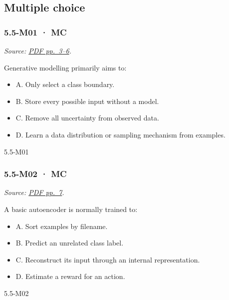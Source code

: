 \subsection{Multiple choice}\label{multiple-choice-17}

\noindent\begin{minipage}{\linewidth}

\subsubsection{5.5-M01 · MC}\label{m01-mc-16}

\emph{Source:
\href{../Lecture\%20Slides/5.5.\%20Generative\%20Models.pdf\#page=3}{PDF
pp.~3--6}.}

Generative modelling primarily aims to:

\begin{itemize}
\tightlist
\item
  A. Only select a class boundary.
\item
  B. Store every possible input without a model.
\item
  C. Remove all uncertainty from observed data.
\item
  D. Learn a data distribution or sampling mechanism from examples.
\end{itemize}

\begin{solution}[8mm]{5.5-M01}

\end{solution}
\end{minipage}\par\medskip

\noindent\begin{minipage}{\linewidth}

\subsubsection{5.5-M02 · MC}\label{m02-mc-16}

\emph{Source:
\href{../Lecture\%20Slides/5.5.\%20Generative\%20Models.pdf\#page=7}{PDF
pp.~7}.}

A basic autoencoder is normally trained to:

\begin{itemize}
\tightlist
\item
  A. Sort examples by filename.
\item
  B. Predict an unrelated class label.
\item
  C. Reconstruct its input through an internal representation.
\item
  D. Estimate a reward for an action.
\end{itemize}

\begin{solution}[8mm]{5.5-M02}

\end{solution}
\end{minipage}\par\medskip

